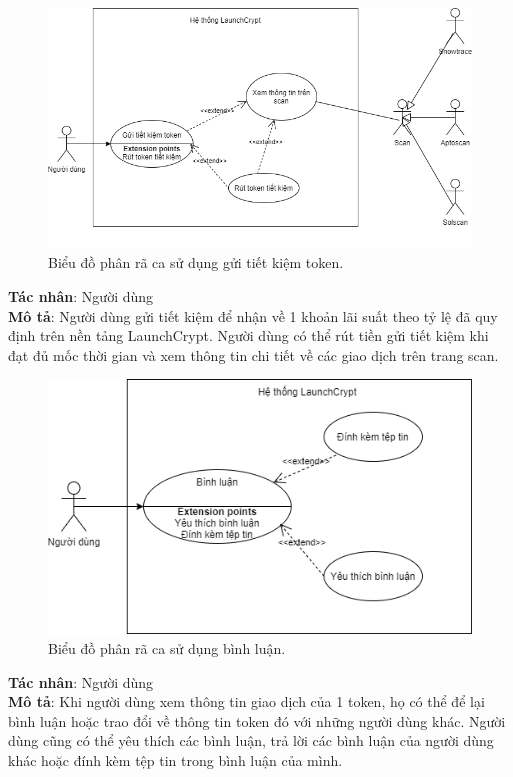 \begin{figure}[H]
    \begin{center}
        \includegraphics[width=1\textwidth]{figures/c2/GuiTKUCDiagram.png}
        \caption{Biểu đồ phân rã ca sử dụng gửi tiết kiệm token.}
        \label{fig:feature_interaction_example}
    \end{center}
\end{figure}
\hspace{-1cm}\textbf{Tác nhân}: Người dùng \\
\textbf{Mô tả}: Người dùng gửi tiết kiệm để nhận về 1 khoản lãi suất theo tỷ lệ đã quy định
trên nền tảng LaunchCrypt. Người dùng có thể rút tiền gửi tiết kiệm khi đạt đủ mốc thời gian và
xem thông tin chi tiết về các giao dịch trên trang scan.
\clearpage

\begin{figure}[H]
    \begin{center}
        \includegraphics[width=1\textwidth]{figures/c2/Comment.png}
        \caption{Biểu đồ phân rã ca sử dụng bình luận.}
        \label{fig:feature_interaction_example}
    \end{center}
\end{figure}
\hspace{-1cm}\textbf{Tác nhân}: Người dùng \\
\textbf{Mô tả}: Khi người dùng xem thông tin giao dịch của 1 token, họ có thể
để lại bình luận hoặc trao đổi về thông tin token đó với những người dùng khác.
Người dùng cũng có thể yêu thích các bình luận, trả lời các bình luận của người
dùng khác hoặc đính kèm tệp tin trong bình luận của mình.
\clearpage

